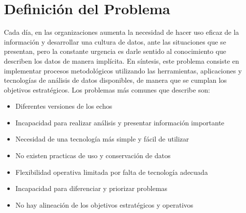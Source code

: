 \documentclass[11pt,titlepage]{report}
\begin{document}
  

\section{Definición del Problema}
Cada día, en las organizaciones aumenta la necesidad de hacer uso eficaz de la información y desarrollar una cultura de datos, ante las situaciones que se presentan,  pero la constante urgencia es darle sentido al conocimiento que describen los datos de manera implícita. En síntesis, este problema consiste en implementar procesos metodológicos utilizando las herramientas, aplicaciones y tecnologías de análisis de datos disponibles, de manera que se cumplan los objetivos estratégicos. Los problemas más comunes que describe \cite{gui02} son:
\begin{multicols}{2}
	\begin{itemize}
		\item Diferentes versiones de los echos
		\item  Incapacidad para realizar análisis y presentar información importante
		\item  Necesidad de una tecnología más simple y fácil de utilizar
		\item  No existen practicas de uso y conservación de datos
		\item  Flexibilidad operativa limitada por falta de tecnología adecuada
		\item  Incapacidad para diferenciar y priorizar problemas 
		\item  No hay alineación de los objetivos estratégicos y operativos
	\end{itemize}
\end{multicols}
\end{document}
